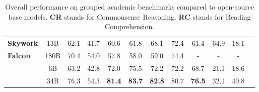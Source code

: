 \begin{table}[tb!]
{\begin{tabular}{@{}l c c c c c c c c c c c@{}}
\gmidrule
\textbf{Skywork} & 13B & 62.1 & 41.7 & 60.6 & 61.8 & 68.1  & 72.4 & 61.4 & 64.9 & 18.1   \\
\gmidrule
\textbf{Falcon} & 180B &  70.4  &  54.0  &  57.8  &  58.0  &  59.0 &  74.4  &  - &  -    &  -    \\
\gmidrule
\multirow{2}{*}{\textbf{Yi}} & 6B & 63.2 & 42.8 & 72.0 & 75.5 & 72.2 & 72.2 & 68.7 & 21.1 & 18.6  \\
& 34B & 76.3 & 54.3 &\textbf{81.4} & \textbf{83.7} & \textbf{82.8} & 80.7 & \textbf{76.5}  & 32.1 & 40.8   \\

\bottomrule

\end{tabular}
}
\caption{Overall performance on grouped academic benchmarks compared to open-source base models. \textbf{CR} stands for Commonsense Reasoning. \textbf{RC} stands for Reading Comprehension.
}
\label{tab:models}
\end{table}